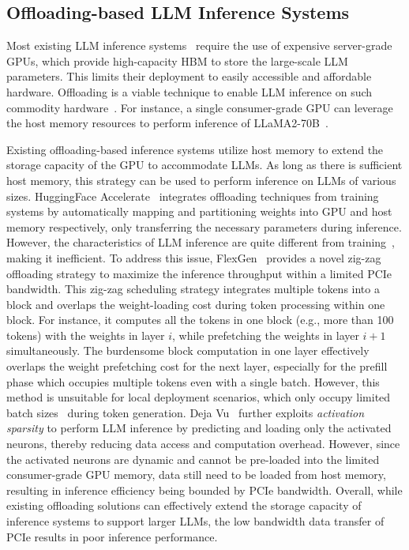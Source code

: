 \subsection{Offloading-based LLM Inference Systems}\label{sec:background-offloading}
Most existing LLM inference systems~\cite{tensorrt-llm, rasley2020deepspeed, yu2022orca, kwon2023efficient} require the use of expensive server-grade GPUs, which provide high-capacity HBM to store the large-scale LLM parameters. This limits their deployment to easily accessible and affordable hardware. Offloading is a viable technique to enable LLM inference on such commodity hardware~\cite{jain2022hugging}. For instance, a single consumer-grade GPU can leverage the host memory resources to perform inference of LLaMA2-70B~\cite{rasley2020deepspeed, huggingface-accelerate}. 

Existing offloading-based inference systems utilize host memory to extend the storage capacity of the GPU to accommodate LLMs. As long as there is sufficient host memory, this strategy can be used to perform inference on LLMs of various sizes. 
HuggingFace Accelerate~\cite{jain2022hugging} integrates offloading techniques from training systems by automatically mapping and partitioning weights into GPU and host memory respectively, only transferring the necessary parameters during inference. However, the characteristics of LLM inference are quite different from training~\cite{cho2024llmservingsim}, making it inefficient. To address this issue, FlexGen~\cite{sheng2023flexgen} provides a novel zig-zag offloading strategy to maximize the inference throughput within a limited PCIe bandwidth. This zig-zag scheduling strategy integrates multiple tokens into a block and overlaps the weight-loading cost during token processing within one block. For instance, it computes all the tokens in one block (e.g., more than 100 tokens) with the weights in layer $i$, while prefetching the weights in layer $i+1$ simultaneously. The burdensome block computation in one layer effectively overlaps the weight prefetching cost for the next layer, especially for the prefill phase which occupies multiple tokens even with a single batch. However, this method is unsuitable for local deployment scenarios, which only occupy limited batch sizes~\cite{hong2024flashdecoding++} during token generation.
Deja Vu~\cite{liu2023deja} further exploits \textit{activation sparsity} to perform LLM inference by predicting and loading only the activated neurons, thereby reducing data access and computation overhead. 
However, since the activated neurons are dynamic and cannot be pre-loaded into the limited consumer-grade GPU memory, data still need to be loaded from host memory, resulting in inference efficiency being bounded by PCIe bandwidth. 
Overall, while existing offloading solutions can effectively extend the storage capacity of inference systems to support larger LLMs, the low bandwidth data transfer of PCIe results in poor inference performance. 
 


